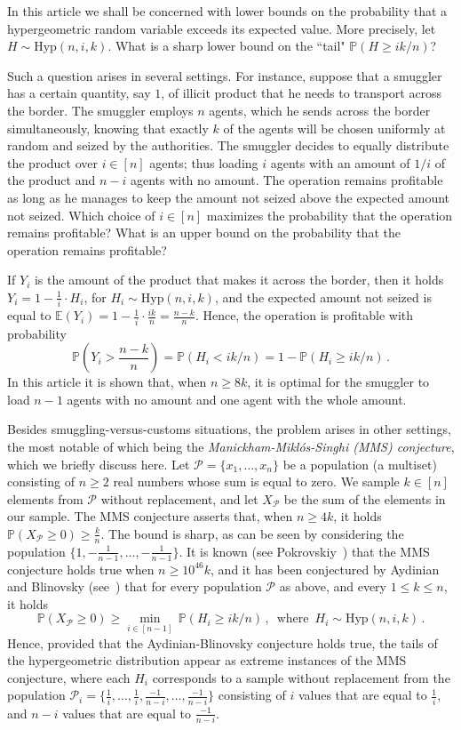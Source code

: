 \documentclass[10pt]{article}
\theoremstyle{plain}
\theoremstyle{definition}
\theoremstyle{remark}
\newcommand{\Prb}{\mathbb{P}}
\newcommand{\Exp}{\mathbb{E}}
\begin{document}
In this article we shall be concerned with lower bounds on the probability that  a hypergeometric random variable exceeds its expected value. More precisely, let $H\sim \text{Hyp}(n,i,k)$. What is a sharp lower bound on the ``tail" $\Prb(H \ge ik/n)$? 

Such a question arises in several settings. 
For instance,  suppose that a smuggler has a certain quantity, say $1$, of illicit product that he needs to transport across the border. The smuggler employs $n$ agents, which he sends across the border simultaneously, knowing that exactly  
$k$ of the agents will be chosen uniformly at random and seized by the authorities.  
The smuggler decides to equally distribute the product over $i\in [n]$ agents; thus loading $i$ agents with an amount of $1/i$ of the product and $n-i$ agents with no amount. 
The operation remains profitable as long as he manages to keep the amount  not seized above the expected amount not seized.  Which choice of $i\in [n]$ maximizes the probability that the operation remains profitable? What is an upper bound on the probability that the operation remains profitable?

If $Y_i$ is the amount of the product that makes it across the border, then it holds $Y_i = 1 -\frac{1}{i} \cdot H_i$, for $H_i\sim\text{Hyp}(n,i,k)$, and the expected amount not seized is equal to $\Exp(Y_i)=1-\frac{1}{i}\cdot \frac{ik}{n} = \frac{n-k}{n}$. 
Hence,  the operation is profitable with probability   
\[
\Prb\left(Y_i >  \frac{n-k}{n}\right) = \Prb(H_i < ik/n) = 1 - \Prb(H_i \ge ik/n) \, .
\]  
In this article it is shown that, when $n\ge 8k$, it is optimal for the smuggler to load $n-1$ agents with no amount and one agent with the whole amount. 
 
Besides smuggling-versus-customs situations, the problem  arises in other settings, the most notable of which being the  \emph{Manickham-Mikl\'os-Singhi (MMS) conjecture}, which we briefly discuss here. Let $\mathcal{P}=\{x_1, \ldots,x_n\}$ be a population (a multiset) consisting of $n\ge 2$ real numbers whose sum is equal to zero. We sample $k\in [n]$ elements from $\mathcal{P}$ without replacement, and let $X_{\mathcal{P}}$ be the sum of the elements in our sample. The MMS conjecture asserts that, when $n\ge 4k$, it holds $\Prb(X_{\mathcal{P}}\ge 0)\ge \frac{k}{n}$. The bound is sharp, as can be seen by considering the population $\{1,-\frac{1}{n-1},\ldots,-\frac{1}{n-1}\}$. 
It is known (see Pokrovskiy~\cite{Pokrovskiy}) that the MMS conjecture holds true when $n\ge 10^{46}k$, and it has been conjectured by Aydinian and Blinovsky (see~\cite{Aydinian_Blinovsky}) that for every population $\mathcal{P}$ as above, and every $1\le k\le n$, it holds 
\[
\Prb(X_{\mathcal{P}}\ge 0) \ge \min_{i\in [n-1]} \, \Prb(H_i \ge ik/n) \, , \, \text{ where } \, H_i \sim\text{Hyp}(n,i,k) \, .
\]
Hence, provided that the Aydinian-Blinovsky conjecture holds true, the tails of  the hypergeometric distribution appear as extreme instances of the MMS conjecture, where each $H_i$ corresponds to a sample without replacement from the population $\mathcal{P}_i=\{\frac{1}{i},\ldots,\frac{1}{i}, \frac{-1}{n-i},\ldots,\frac{-1}{n-i}\}$ consisting of $i$ values that are equal to $\frac{1}{i}$, and $n-i$ values that are equal to $\frac{-1}{n-i}$. 
\end{document}
